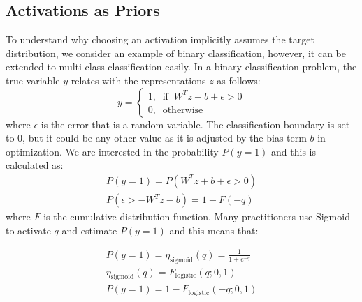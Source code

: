 \documentclass[runningheads]{llncs}
\begin{document}
\subsection{Activations as Priors} 
\label{subsec:activ_as_prior}
To understand why choosing an activation implicitly assumes the target distribution, we consider an example of binary classification, however, it can be extended to multi-class classification easily. In a binary classification problem, the true variable $y$ relates with the representations $z$ as follows:
\begin{equation}
y=
    \begin{cases}
        1, \;\; \text{if} \;\;  W^Tz +b + \epsilon>0\\
        0, \;\; \text{otherwise}
    \end{cases}
\end{equation}
where $\epsilon$ is the error that is a random variable. The classification boundary is set to 0, but it could be any other value as it is adjusted by the bias term $b$ in optimization.
We are interested in the probability $P(y=1)$ and this is calculated as:
\begin{equation}
\begin{aligned}
P(y=1)=P(W^Tz+b + \epsilon>0) \\
P(\epsilon>-W^Tz-b)=1-F(-q)
\label{eq:cumulative}
\end{aligned}
\end{equation}
where $F$ is the cumulative distribution function.
Many practitioners use Sigmoid to activate $q$ and estimate $P(y=1)$ and this means that:

\begin{equation}
\begin{aligned}
P(y=1)=\eta_{\text{sigmoid}}(q)= \frac{1}{1+e^{-q}} \\
\eta_{\text{sigmoid}}(q) =F_{\text{logistic}}(q;0,1) \\ P(y=1)=1-F_{\text{logistic}}(-q;0,1)
\label{eq:log_prior}
\end{aligned}
\end{equation}
\end{document}
